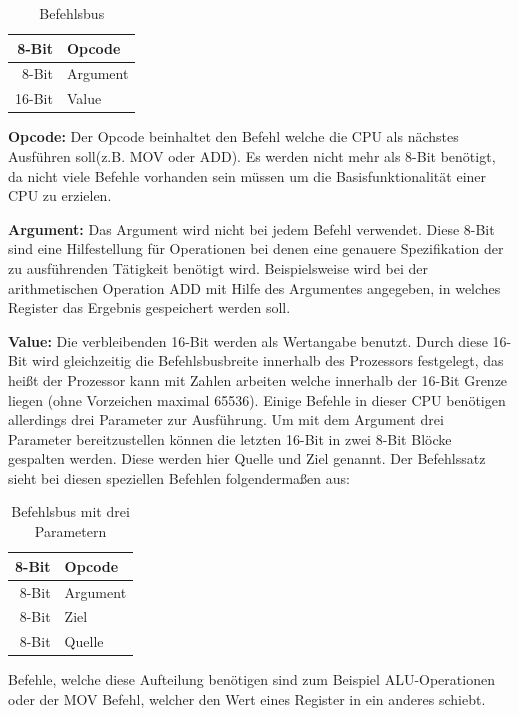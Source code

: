 \documentclass[12pt]{article}
\begin{document}
\begin{table}[!htb]
\centering
\label{Befehlsbus}
\begin{tabular}{|r|l|}
  \hline
  8-Bit & Opcode \\
  \hline
  8-Bit & Argument \\ 
  \hline
  16-Bit & Value\\
  \hline
  
\end{tabular}
\caption{Befehlsbus}
\end{table}
\par\bigskip\noindent\textbf{Opcode: } Der Opcode beinhaltet den Befehl welche die CPU als nächstes Ausführen soll(z.B. MOV oder ADD). Es werden nicht mehr als 8-Bit benötigt, da nicht viele Befehle vorhanden sein müssen um die Basisfunktionalität einer CPU zu erzielen.
\par\bigskip\noindent\textbf{Argument: } Das Argument wird nicht bei jedem Befehl verwendet. Diese 8-Bit sind eine Hilfestellung für Operationen bei denen eine genauere Spezifikation der zu ausführenden Tätigkeit benötigt wird. Beispielsweise wird bei der arithmetischen Operation ADD mit Hilfe des Argumentes angegeben, in welches Register das Ergebnis gespeichert werden soll.
\par\bigskip\noindent\textbf{Value: } Die verbleibenden 16-Bit werden als Wertangabe benutzt. Durch diese 16-Bit wird gleichzeitig die Befehlsbusbreite innerhalb des Prozessors festgelegt, das heißt der Prozessor kann mit Zahlen arbeiten welche innerhalb der 16-Bit Grenze liegen (ohne Vorzeichen maximal 65536). Einige Befehle in dieser CPU benötigen allerdings drei Parameter zur Ausführung. Um mit dem Argument drei Parameter bereitzustellen können die letzten 16-Bit in zwei 8-Bit Blöcke gespalten werden. Diese werden hier Quelle und Ziel genannt. Der Befehlssatz sieht bei diesen speziellen Befehlen folgendermaßen aus: 
\begin{table}[!htb]
\centering
\caption{Befehlsbus mit drei Parametern}
\label{Befehlsbus3P}
\begin{tabular}{|r|l|}
  \hline
  8-Bit & Opcode \\
  \hline
  8-Bit & Argument \\ 
  \hline
  8-Bit & Ziel\\
  \hline
  8-Bit & Quelle\\
  \hline
\end{tabular}
\end{table}
\newline
Befehle, welche diese Aufteilung benötigen sind zum Beispiel ALU-Operationen oder der MOV Befehl, welcher den Wert eines Register in ein anderes schiebt.
\end{document}
